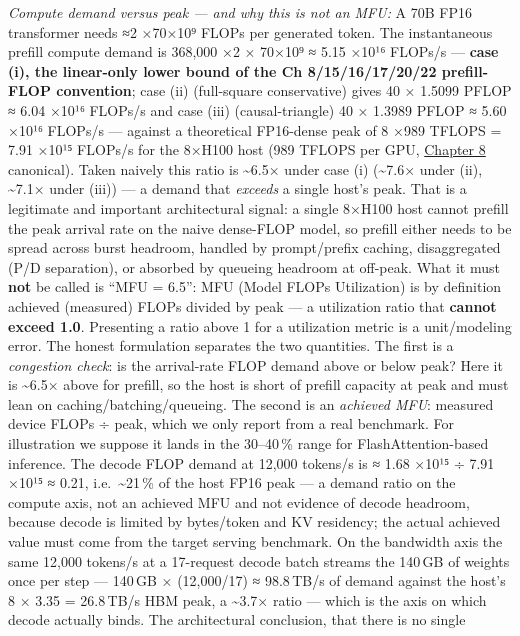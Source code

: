 \emph{Compute demand versus peak --- and why this is not an MFU:} A 70B
FP16 transformer needs ≈2 ×70×10⁹ FLOPs per generated token. The
instantaneous prefill compute demand is 368,000 ×2 × 70×10⁹ ≈ 5.15 ×10¹⁶
FLOPs/s --- \textbf{case (i), the linear-only lower bound of the Ch
8/15/16/17/20/22 prefill-FLOP convention}; case (ii) (full-square
conservative) gives 40 × 1.5099 PFLOP ≈ 6.04 ×10¹⁶ FLOPs/s and case
(iii) (causal-triangle) 40 × 1.3989 PFLOP ≈ 5.60 ×10¹⁶ FLOPs/s ---
against a theoretical FP16-dense peak of 8 ×989 TFLOPS = 7.91 ×10¹⁵
FLOPs/s for the 8×H100 host (989 TFLOPS per GPU, \hyperref[chap:8]{Chapter 8} canonical).
Taken naively this ratio is \textasciitilde6.5× under case (i)
(\textasciitilde7.6× under (ii), \textasciitilde7.1× under (iii)) --- a
demand that \emph{exceeds} a single host's peak. That is a legitimate
and important architectural signal: a single 8×H100 host cannot prefill
the peak arrival rate on the naive dense-FLOP model, so prefill either
needs to be spread across burst headroom, handled by prompt/prefix
caching, disaggregated (P/D separation), or absorbed by queueing
headroom at off-peak. What it must \textbf{not} be called is ``MFU =
6.5'': MFU (Model FLOPs Utilization) is by definition achieved
(measured) FLOPs divided by peak --- a utilization ratio that
\textbf{cannot exceed 1.0}. Presenting a ratio above 1 for a utilization
metric is a unit/modeling error. The honest formulation separates the
two quantities. The first is a \emph{congestion check}: is the
arrival-rate FLOP demand above or below peak? Here it is
\textasciitilde6.5× above for prefill, so the host is short of prefill
capacity at peak and must lean on caching/batching/queueing. The second
is an \emph{achieved MFU}: measured device FLOPs ÷ peak, which we only
report from a real benchmark. For illustration we suppose it lands in
the 30--40\,\% range for FlashAttention-based inference. The decode FLOP
demand at 12,000 tokens/s is ≈ 1.68 ×10¹⁵ ÷ 7.91 ×10¹⁵ ≈ 0.21,
i.e.~\textasciitilde21\,\% of the host FP16 peak --- a demand ratio on
the compute axis, not an achieved MFU and not evidence of decode
headroom, because decode is limited by bytes/token and KV residency; the
actual achieved value must come from the target serving benchmark. On
the bandwidth axis the same 12,000 tokens/s at a 17-request decode batch
streams the 140\,GB of weights once per step --- 140\,GB × (12,000/17) ≈
98.8\,TB/s of demand against the host's 8 × 3.35 = 26.8\,TB/s HBM peak,
a \textasciitilde3.7× ratio --- which is the axis on which decode
actually binds. The architectural conclusion, that there is no single
